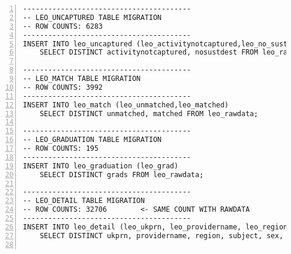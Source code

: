 \begin{lstlisting}[breaklines, frame=single, numbers=left, caption={PL/pgSQL's DML Script for Education Normalized Database Migration.}, label=commandline-02]
----------------------------------------
-- LEO_UNCAPTURED TABLE MIGRATION 
-- ROW COUNTS: 6283
---------------------------------------- 
INSERT INTO leo_uncaptured (leo_activitynotcaptured,leo_no_sust_dest)
	SELECT DISTINCT activitynotcaptured, nosustdest FROM leo_rawdata;

----------------------------------------
-- LEO_MATCH TABLE MIGRATION 
-- ROW COUNTS: 3992
---------------------------------------- 
INSERT INTO leo_match (leo_unmatched,leo_matched)
	SELECT DISTINCT unmatched, matched FROM leo_rawdata;

----------------------------------------
-- LEO_GRADUATION TABLE MIGRATION 
-- ROW COUNTS: 195
---------------------------------------- 
INSERT INTO leo_graduation (leo_grad)
	SELECT DISTINCT grads FROM leo_rawdata;

----------------------------------------
-- LEO_DETAIL TABLE MIGRATION 
-- ROW COUNTS: 32706		<- SAME COUNT WITH RAWDATA 
---------------------------------------- 
INSERT INTO leo_detail (leo_ukprn, leo_providername, leo_region, leo_subject, leo_sex, leo_yearaftergraduation)
	SELECT DISTINCT ukprn, providername, region, subject, sex, yearaftergraduation FROM leo_rawdata;


\end{lstlisting}
